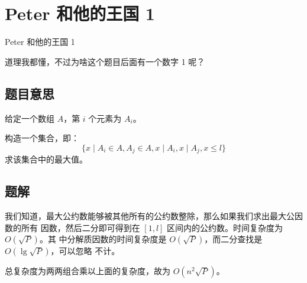 \def\sectionName{Peter 和他的王国 1}
\section{\sectionName}



\begin{frame}

\isBeamerMode\relax
    {\Huge \sectionName}\par
\fi




道理我都懂，不过为啥这个题目后面有一个数字 1 呢？



\end{frame}

\subsection{题目意思}
\begin{frame} %
给定一个数组 $A$，第 $i$ 个元素为 $A_i$。

构造一个集合，即：\[\{x \mid A_i \in A, A_j \in A, x \mid A_i, x \mid A_j, x \le
l\}\]求该集合中的最大值。
\end{frame}



\subsection{题解}
\begin{frame} %
我们知道，最大公约数能够被其他所有的公约数整除，那么如果我们求出最大公因数的所有
因数，然后二分即可得到在 $[1, l]$ 区间内的公约数。时间复杂度为 $O(\sqrt P)$。其
中分解质因数的时间复杂度是 $O(\sqrt P)$，而二分查找是 $O(\lg \sqrt P)$，可以忽略
不计。

总复杂度为两两组合乘以上面的复杂度，故为 $O(n^2 \sqrt P)$。
\end{frame}
